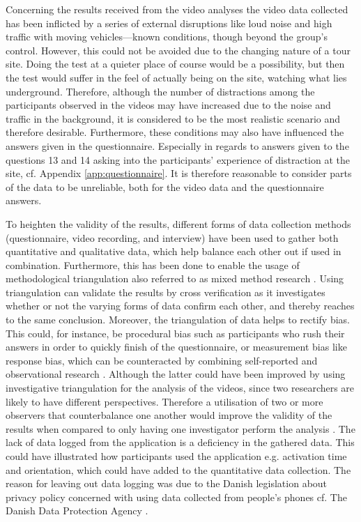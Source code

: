 Concerning the results received from the video analyses the video data collected has been inflicted by a series of external disruptions like loud noise and high traffic with moving vehicles---known conditions, though beyond the group’s control. However, this could not be avoided due to the changing nature of a tour site. Doing the test at a quieter place of course would be a possibility, but then the test would suffer in the feel of actually being on the site, watching what lies underground. Therefore, although the number of distractions among the participants observed in the videos may have increased due to the noise and traffic in the background, it is considered to be the most realistic scenario and therefore desirable. Furthermore, these conditions may also have influenced the answers given in the questionnaire. Especially in regards to answers given to the questions 13 and 14 asking into the participants’ experience of distraction at the site, cf. Appendix \ref{app:questionnaire}.
It is therefore reasonable to consider parts of the data to be unreliable, both for the video data and the questionnaire answers. 

To heighten the validity of the results, different forms of data collection methods (questionnaire, video recording, and interview) have been used to gather both quantitative and qualitative data, which help balance each other out if used in combination. Furthermore, this has been done to enable the usage of methodological triangulation also referred to as mixed method research \cite{Kennedy}. Using triangulation can validate the results by cross verification as it investigates whether or not the varying forms of data confirm each other, and thereby reaches to the same conclusion. Moreover, the triangulation of data helps to rectify bias. This could, for instance, be procedural bias such as participants who rush their answers in order to quickly finish of the questionnaire, or measurement bias like response bias, which can be counteracted by combining self-reported and observational research \cite{Kennedy}. Although the latter could have been improved by using investigative triangulation for the analysis of the videos, since two researchers are likely to have different perspectives. Therefore a utilisation of two or more observers that counterbalance one another would improve the validity of the results when compared to only having one investigator perform the analysis \cite{Kennedy}. The lack of data logged from the application is a deficiency in the gathered data. This could have illustrated how participants used the application e.g. activation time and orientation, which could have added to the quantitative data collection. The reason for leaving out data logging was due to the Danish legislation about privacy policy concerned with using data collected from people’s phones cf. The Danish Data Protection Agency \cite{Datatilsynet}.

